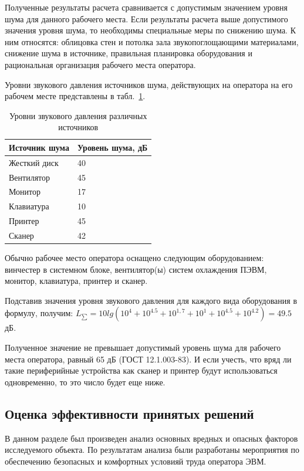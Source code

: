 Полученные результаты расчета сравнивается с допустимым значением уровня шума для данного рабочего места.
Если результаты расчета выше допустимого значения уровня шума, то необходимы специальные меры по снижению шума.
К ним относятся: облицовка стен и потолка зала звукопоглощающими материалами, снижение шума в источнике, правильная планировка оборудования и рациональная организация рабочего места оператора.

Уровни звукового давления источников шума, действующих на оператора на его рабочем месте представлены в табл.~\ref{tab:ecol-noisesource}.

\begin{footnotesize}
\begin{longtable}[h]{|p{}|p{}|}
	\caption{\label{tab:ecol-noisesource}Уровни звукового давления различных источников} \\
	\hline
		\textbf{Источник шума} & \textbf{Уровень шума, дБ} \\
	\hline \endhead
		Жесткий диск & 40 \\
	\hline
		Вентилятор & 45 \\
	\hline
		Монитор & 17 \\
	\hline
		Клавиатура & 10 \\
	\hline
		Принтер & 45 \\
	\hline
		Сканер & 42 \\
	\hline
\end{longtable}
\end{footnotesize}

Обычно рабочее место оператора оснащено следующим оборудованием: винчестер в системном блоке, вентилятор(ы) систем охлаждения ПЭВМ, монитор, клавиатура, принтер и сканер.

Подставив значения уровня звукового давления для каждого вида оборудования в формулу, получим:
$L_{\sum}=10 lg (10^4 + 10^{4.5} + 10^{1,7} + 10^1 + 10^{4.5} + 10^{4.2}) = 49.5$ дБ.

Полученное значение не превышает допустимый уровень шума для рабочего места оператора, равный 65 дБ (ГОСТ 12.1.003-83).
И если учесть, что вряд ли такие периферийные устройства как сканер и принтер будут использоваться одновременно, то это число будет еще ниже. 

\subsection{Оценка эффективности принятых решений}

В данном разделе был произведен анализ основных вредных и опасных факторов исследуемого объекта.
По результатам анализа были разработаны мероприятия по обеспечению безопасных и комфортных условияй труда оператора ЭВМ.

